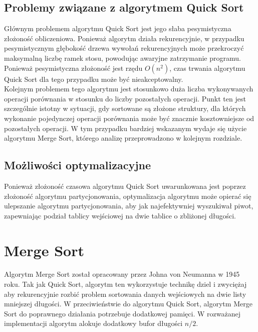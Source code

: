 \begin{figure}[]
	\centering
	
	\caption[]{}
	\label{fig:quick-sort-density}
\end{figure}

\subsection{Problemy związane z algorytmem Quick Sort}
Głównym problemem algorytmu Quick Sort jest jego słaba pesymistyczna złożoność obliczeniowa. Ponieważ algorytm działa rekurencyjnie, w przypadku pesymistycznym głębokość drzewa wywołań rekurencyjnych może przekroczyć maksymalną liczbę ramek stosu, powodując awaryjne zatrzymanie programu. Ponieważ pesymistyczna złożoność jest rzędu $O(n^2)$, czas trwania algorytmu Quick Sort dla tego przypadku może być nieakceptowalny.\\

Kolejnym problemem tego algorytmu jest stosunkowo duża liczba wykonywanych operacji porównania w stosunku do liczby pozostałych operacji. Punkt ten jest szczególnie istotny w sytuacji, gdy sortowane są złożone struktury, dla których
wykonanie pojedynczej operacji porównania może być znacznie kosztowniejsze od pozostałych operacji. W tym przypadku bardziej wskazanym wydaje się użycie algorytmu Merge Sort, którego analizę przeprowadzono w kolejnym rozdziale.

\subsection{Możliwości optymalizacyjne}
Ponieważ złożoność czasowa algorytmu Quick Sort uwarunkowana jest poprzez złożoność algorytmu partycjonowania, optymalizacja algorytmu może opierać się ulepszanie algorytmu partycjonowania, aby jak najefektywniej wyszukiwał piwot, zapewniając podział tablicy wejściowej na dwie tablice o zbliżonej długości.
 

\section{Merge Sort}


Algorytm Merge Sort został opracowany przez Johna von Neumanna w 1945 roku. Tak jak Quick Sort, algorytm ten wykorzystuje
technikę dziel i zwyciężaj aby rekurencyjnie rozbić problem sortowania danych wejściowych na dwie listy mniejszej długości.
W przeciwieństwie do algorytmu Quick Sort, algorytm Merge Sort do poprawnego działania potrzebuje dodatkowej pamięci.
W rozważanej implementacji algorytm alokuje dodatkowy bufor długości $n/2$.\\


